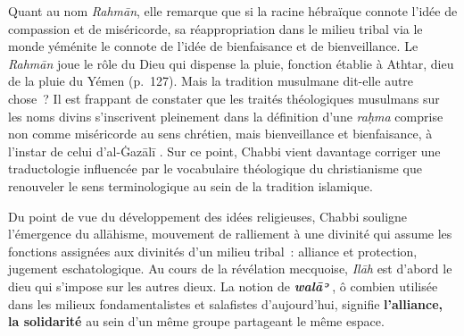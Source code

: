 
Quant au nom \emph{Rahmān}, elle remarque que si la racine hébraïque
connote l'idée de compassion et de miséricorde, sa réappropriation dans
le milieu tribal via le monde yéménite le connote de l'idée de
bienfaisance et de bienveillance. Le \emph{Rahmān} joue le rôle du Dieu
qui dispense la pluie, fonction établie à Athtar, dieu de la pluie du
Yémen (p.~127). Mais la tradition musulmane dit-elle autre chose~? Il
est frappant de constater que les traités théologiques musulmans sur les
noms divins s'inscrivent pleinement dans la définition d'une
\emph{raḥma} comprise non comme miséricorde au sens chrétien, mais
bienveillance et bienfaisance, à l'instar de celui d'al-Ġazālī \label{theol:AlGazali23}. Sur ce
point, Chabbi vient davantage corriger une traductologie influencée par
le vocabulaire théologique du christianisme que renouveler le sens
terminologique au sein de la tradition islamique.


Du point de vue du développement des idées religieuses, Chabbi souligne
l'émergence du allāhisme, mouvement de ralliement à une divinité qui
assume les fonctions assignées aux divinités d'un milieu tribal~:
alliance et protection, jugement eschatologique. Au cours de la
révélation mecquoise, \emph{Ilāh} est d'abord le dieu qui s'impose sur
les autres dieux. La notion de \emph{\textbf{walāʾ}} , ô combien
utilisée dans les milieux fondamentalistes et salafistes d'aujourd'hui,
signifie \textbf{l'alliance, la solidarité} au sein d'un même groupe
partageant le même espace.


